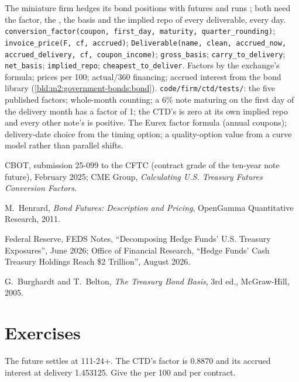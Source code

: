 \begin{build}
 The miniature firm hedges its bond positions with futures
and runs ; both need the factor, the , the basis and
the implied repo of every deliverable, every day.
 \texttt{conversion\_factor(coupon, first\_day, maturity,
quarter\_rounding)}; \texttt{invoice\_price(F, cf, accrued)};
\texttt{Deliverable(name, clean, accrued\_now, accrued\_delivery, cf,
coupon\_income)}; \texttt{gross\_basis}; \texttt{carry\_to\_delivery};
\texttt{net\_basis}; \texttt{implied\_repo}; \texttt{cheapest\_to\_deliver}.
 Factors by the exchange's formula; prices per 100; actual/360
financing; accrued interest from the bond library
(\cref{bld:m2:government-bonds:bond}).
 \texttt{code/firm/ctd/tests/}: the five published
factors; whole-month counting; a 6\% note maturing on the first day of the
delivery month has a factor of 1; the CTD's  is zero at its own
implied repo and every other note's is positive.
 The Eurex factor formula (annual coupons); delivery-date
choice from the timing option; a quality-option value from a curve model
rather than parallel shifts.
\end{build}

\begin{omsources}
\item CBOT, submission 25-099 to the CFTC (contract grade of the ten-year note
future), February 2025; CME Group, \emph{Calculating U.S. Treasury Futures
Conversion Factors}.
\item M.\ Henrard, \emph{Bond Futures: Description and Pricing}, OpenGamma
Quantitative Research, 2011.
\item Federal Reserve, FEDS Notes, ``Decomposing Hedge Funds' U.S. Treasury
Exposures'', June 2026; Office of Financial Research, ``Hedge Funds' Cash
Treasury Holdings Reach \$2 Trillion'', August 2026.
\item G.\ Burghardt and T.\ Belton, \emph{The Treasury Bond Basis}, 3rd ed.,
McGraw-Hill, 2005.
\end{omsources}

\section{Exercises}

\begin{exercise}[$\star$]\label{exo:m2:bond-futures:1}
The future settles at 111-24+. The CTD's factor is 0.8870 and its accrued
interest at delivery 1.453125. Give the  per 100 and per
contract.
\end{exercise}

